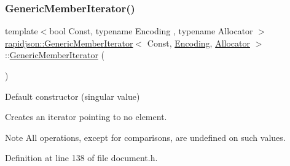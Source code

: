 \subsubsection{\texorpdfstring{GenericMemberIterator()}{GenericMemberIterator()}\hspace{0.1cm}{\footnotesize\ttfamily [1/3]}}
{\footnotesize\ttfamily template$<$bool Const, typename Encoding , typename Allocator $>$ \\
\mbox{\hyperlink{classrapidjson_1_1_generic_member_iterator}{rapidjson\+::\+Generic\+Member\+Iterator}}$<$ Const, \mbox{\hyperlink{classrapidjson_1_1_encoding}{Encoding}}, \mbox{\hyperlink{classrapidjson_1_1_allocator}{Allocator}} $>$\+::\mbox{\hyperlink{classrapidjson_1_1_generic_member_iterator}{Generic\+Member\+Iterator}} (\begin{DoxyParamCaption}{ }\end{DoxyParamCaption})}



Default constructor (singular value) 

Creates an iterator pointing to no element. \begin{DoxyNote}{Note}
All operations, except for comparisons, are undefined on such values. 
\end{DoxyNote}


Definition at line 138 of file document.\+h.


\begin{DoxyCode}{0}

\end{DoxyCode}
\mbox{\label{classrapidjson_1_1_generic_member_iterator_aa30ffef74b3f4978b403024d81b484e4}} 

